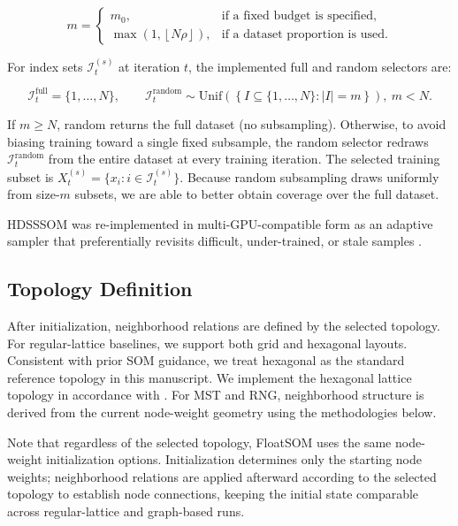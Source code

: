 \documentclass[10pt]{article} %
\begin{document}
\begin{equation}
m=
\begin{cases}
m_0, & \text{if a fixed budget is specified},\\[4pt]
\max\!\left(1,\left\lfloor N\rho \right\rfloor\right), & \text{if a dataset proportion is used}.
\end{cases}
\end{equation}

For index sets $\mathcal{I}_t^{(s)}$ at iteration $t$, the implemented full and random selectors are:

\begin{equation}
\mathcal{I}_t^{\mathrm{full}}=\{1,\dots,N\},
\qquad
\mathcal{I}_t^{\mathrm{random}} \sim \mathrm{Unif}\!\left(\left\{I\subseteq\{1,\dots,N\}:|I|=m\right\}\right),\ m<N.
\end{equation}

If $m\ge N$, random returns the full dataset (no subsampling). Otherwise, to avoid biasing training toward a single fixed subsample, the random selector redraws $\mathcal{I}_t^{\mathrm{random}}$ from the entire dataset at every training iteration. The selected training subset is $X_t^{(s)}=\{x_i:i\in\mathcal{I}_t^{(s)}\}$. Because random subsampling draws uniformly from size-$m$ subsets, we are able to better obtain coverage over the full dataset.

HDSSSOM was re-implemented in multi-GPU-compatible form as an adaptive sampler that preferentially revisits difficult, under-trained, or stale samples \citep{wetmoreSpeedingSelfOrganizingFeature2005}.

\subsection{Topology Definition}

After initialization, neighborhood relations are defined by the selected topology. For regular-lattice baselines, we support both grid and hexagonal layouts. Consistent with prior SOM guidance, we treat hexagonal as the standard reference topology in this manuscript. We implement the hexagonal lattice topology in accordance with \citep{vettigliJustGlowingMinisom2018}. For MST and RNG, neighborhood structure is derived from the current node-weight geometry using the methodologies below.

Note that regardless of the selected topology, FloatSOM uses the same node-weight initialization options. Initialization determines only the starting node weights; neighborhood relations are applied afterward according to the selected topology to establish node connections, keeping the initial state comparable across regular-lattice and graph-based runs.
\end{document}
